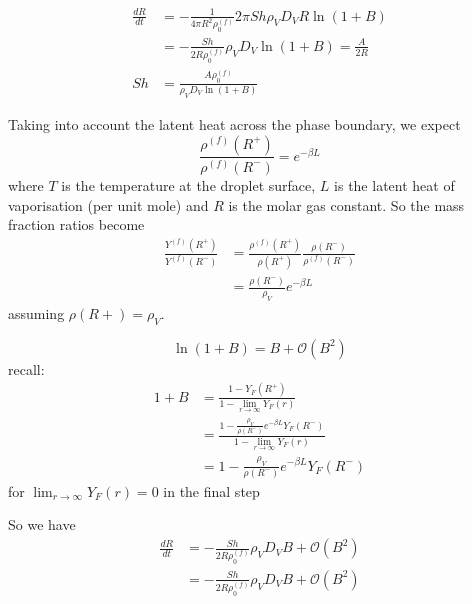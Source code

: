 \documentclass[12pt]{report}
\begin{document}
\begin{equation}
  \begin{aligned}
  \frac{dR}{dt} &=
  -\frac{1}{4\pi R^2 \rho^{(f)}_0}
  2\pi Sh \rho_V D_V R \ln{(1 + B)} \\
  &=
  -\frac{Sh}{2 R \rho^{(f)}_0}
  \rho_V D_V \ln{(1 + B)} =
  \frac{A}{2 R} \\
  Sh &= \frac{A \rho^{(f)}_0}{\rho_V D_V \ln{(1+B)}}
  \end{aligned}
\end{equation}

Taking into account the latent heat across the phase boundary, we expect
\begin{equation}
  \frac{\rho^{(f)}(R^+)}{\rho^{(f)}(R^-)} =
  e^{-\beta L}
\end{equation}
where $T$ is the temperature at the droplet surface, $L$ is the latent heat of vaporisation (per unit mole) and $R$ is the molar gas constant.
So the mass fraction ratios become
\begin{equation}
  \begin{aligned}
    \frac{Y^{(f)}(R^+)}{Y^{(f)}(R^-)} &=
    \frac{\rho^{(f)}(R^+)}{\rho(R^+)}
    \frac{\rho(R^-)}{\rho^{(f)}(R^-)} \\
    &=
    \frac{\rho(R^-)}{\rho_V}
    e^{-\beta L}
  \end{aligned}
\end{equation}
assuming $\rho(R+) = \rho_V$.

\begin{equation*}
  \ln{(1 + B)} = B + \mathcal{O}(B^2)
\end{equation*}
recall:
\begin{equation*}
  \begin{aligned}
    1 + B &=
    \frac{1 - Y_F(R^+)}{1 - \displaystyle{\lim_{r \to \infty}} Y_F(r)} \\
    &=
    \frac{1 - \frac{\rho_V}{\rho(R^-)}
      e^{-\beta L} Y_F(R^-)}{1 - \displaystyle{\lim_{r \to \infty}} Y_F(r)} \\
    &=
    1 - \frac{\rho_V}{\rho(R^-)} e^{-\beta L} Y_F(R^-)
  \end{aligned}
\end{equation*}
for $\lim_{r \to \infty} Y_F(r) = 0$ in the final step

So we have
\begin{equation*}
  \begin{aligned}
    \frac{dR}{dt} &=
    -\frac{Sh}{2 R \rho^{(f)}_0}
    \rho_V D_V B + \mathcal{O}(B^2) \\
    &=
    -\frac{Sh}{2 R \rho^{(f)}_0}
    \rho_V D_V B + \mathcal{O}(B^2)
  \end{aligned}
\end{equation*}
\end{document}
